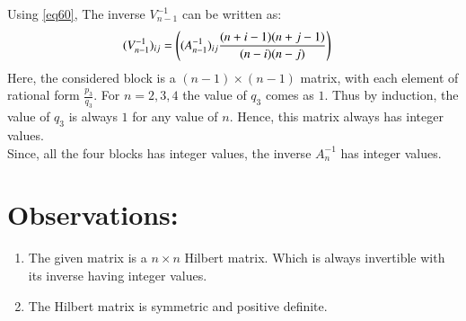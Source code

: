\documentclass[journal,12pt,twocolumn]{IEEEtran}
\begin{document}
Using \eqref{eq60}, The inverse $V_{n-1}^{-1}$ can be written as:
\begin{align}
    (V_{n-1}^{-1})_{ij}&=\left((A_{n-1}^{-1})_{ij}\frac{(n+i-1)(n+j-1)}{(n-i)(n-j)}\right)
\end{align}
Here, the considered block is a $(n-1) \times (n-1)$ matrix, with each element of rational form $\frac{p_3}{q_3}$. For $n=2,3,4$ the value of $q_3$ comes as $1$. Thus by induction, the value of $q_3$ is always $1$ for any value of $n$. Hence, this matrix always has integer values.\\
Since, all the four blocks has integer values, the inverse $A_n^{-1}$ has integer values.
\section{\textbf{Observations:}} 
\begin{enumerate}
    \item The given matrix is a $n\times n$ Hilbert matrix. Which is always invertible with its inverse having integer values.
    \item The Hilbert matrix is symmetric and positive definite.
\end{enumerate}
\end{document}
